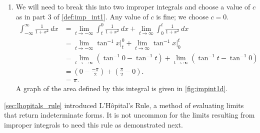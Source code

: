 \begin{example}
\begin{enumerate}
	\item	We will need to break this into two improper integrals and choose a value of $c$ as in part 3 of \autoref{def:imp_int1}. Any value of $c$ is fine; we choose $c=0$.
%
%
\begin{align*}
	\int_{-\infty}^\infty \frac1{1+x^2}\ dx
	&= \lim_{t\to-\infty} \int_t^0\frac{1}{1+x^2}\ dx + \lim_{t\to\infty} \int_0^t\frac{1}{1+x^2}\ dx \\
	&= \lim_{t\to-\infty} \tan^{-1}x\Big|_t^0 + \lim_{t\to\infty} \tan^{-1}x\Big|_0^t\\
	&= \lim_{t\to-\infty} \left(\tan^{-1}0-\tan^{-1}t\right) + \lim_{t\to\infty} \left(\tan^{-1}t-\tan^{-1}0\right)\\		
	&= \left(0-\frac{-\pi}2\right) + \left(\frac{\pi}2-0\right).\\
	&= \pi.
\end{align*}
A graph of the area defined by this integral is given in \autoref{fig:impint1d}.
\end{enumerate}
\end{example}

\autoref{sec:lhopitals_rule} introduced L'Hôpital's Rule, a method of evaluating limits that return indeterminate forms. It is not uncommon for the limits resulting from improper integrals to need this rule as demonstrated next.

